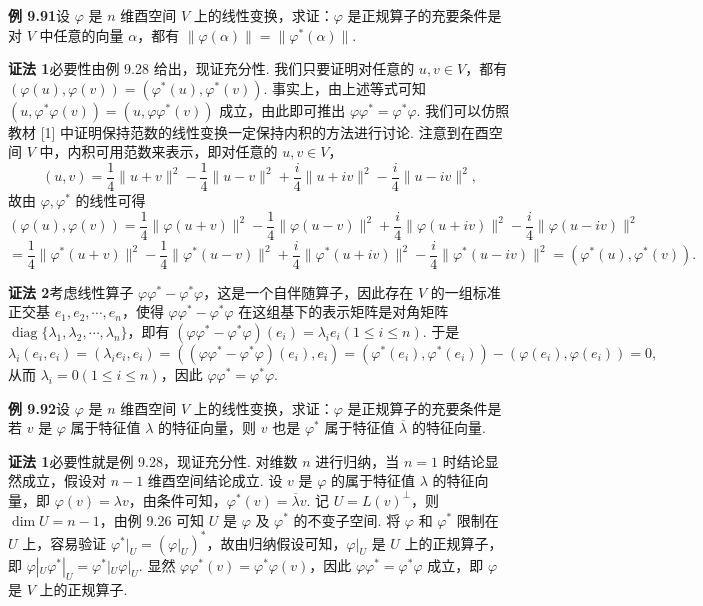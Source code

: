 \documentclass[UTF8, 12pt, fontset=fandol, oneside]{ctexart}
\begin{document}
\noindent\textbf{例 9.91}\quad 设 $\varphi$ 是 $n$ 维酉空间 $V$ 上的线性变换，求证：$\varphi$ 是正规算子的充要条件是对 $V$ 中任意的向量 $\alpha$，都有 $\|\varphi(\alpha)\|=\|\varphi^*(\alpha)\|$.

\noindent\textbf{证法 1}\quad 必要性由例 9.28 给出，现证充分性. 我们只要证明对任意的 $u,v\in V$，都有 $(\varphi(u),\varphi(v))=(\varphi^*(u),\varphi^*(v))$. 事实上，由上述等式可知 $(u,\varphi^*\varphi(v))=(u,\varphi\varphi^*(v))$ 成立，由此即可推出 $\varphi\varphi^*=\varphi^*\varphi$. 我们可以仿照教材 [1] 中证明保持范数的线性变换一定保持内积的方法进行讨论. 注意到在酉空间 $V$ 中，内积可用范数来表示，即对任意的 $u,v\in V$，
\[
(u,v)=\frac14\|u+v\|^2-\frac14\|u-v\|^2+\frac{i}{4}\|u+iv\|^2-\frac{i}{4}\|u-iv\|^2,
\]
故由 $\varphi,\varphi^*$ 的线性可得
\[
(\varphi(u),\varphi(v))
=\frac14\|\varphi(u+v)\|^2-\frac14\|\varphi(u-v)\|^2+\frac{i}{4}\|\varphi(u+iv)\|^2-\frac{i}{4}\|\varphi(u-iv)\|^2
\]
\[
=\frac14\|\varphi^*(u+v)\|^2-\frac14\|\varphi^*(u-v)\|^2+\frac{i}{4}\|\varphi^*(u+iv)\|^2-\frac{i}{4}\|\varphi^*(u-iv)\|^2
=(\varphi^*(u),\varphi^*(v)).
\]

\noindent\textbf{证法 2}\quad 考虑线性算子 $\varphi\varphi^*-\varphi^*\varphi$，这是一个自伴随算子，因此存在 $V$ 的一组标准正交基 $e_1,e_2,\cdots,e_n$，使得 $\varphi\varphi^*-\varphi^*\varphi$ 在这组基下的表示矩阵是对角矩阵 $\operatorname{diag}\{\lambda_1,\lambda_2,\cdots,\lambda_n\}$，即有 $(\varphi\varphi^*-\varphi^*\varphi)(e_i)=\lambda_ie_i(1\le i\le n)$. 于是
\[
\lambda_i(e_i,e_i)=(\lambda_ie_i,e_i)=((\varphi\varphi^*-\varphi^*\varphi)(e_i),e_i)=(\varphi^*(e_i),\varphi^*(e_i))-(\varphi(e_i),\varphi(e_i))=0,
\]
从而 $\lambda_i=0(1\le i\le n)$，因此 $\varphi\varphi^*=\varphi^*\varphi$.

\noindent\textbf{例 9.92}\quad 设 $\varphi$ 是 $n$ 维酉空间 $V$ 上的线性变换，求证：$\varphi$ 是正规算子的充要条件是若 $v$ 是 $\varphi$ 属于特征值 $\lambda$ 的特征向量，则 $v$ 也是 $\varphi^*$ 属于特征值 $\overline{\lambda}$ 的特征向量.

\noindent\textbf{证法 1}\quad 必要性就是例 9.28，现证充分性. 对维数 $n$ 进行归纳，当 $n=1$ 时结论显然成立，假设对 $n-1$ 维酉空间结论成立. 设 $v$ 是 $\varphi$ 的属于特征值 $\lambda$ 的特征向量，即 $\varphi(v)=\lambda v$，由条件可知，$\varphi^*(v)=\overline{\lambda}v$. 记 $U=L(v)^\perp$，则 $\dim U=n-1$，由例 9.26 可知 $U$ 是 $\varphi$ 及 $\varphi^*$ 的不变子空间. 将 $\varphi$ 和 $\varphi^*$ 限制在 $U$ 上，容易验证 $\varphi^*|_U=(\varphi|_U)^*$，故由归纳假设可知，$\varphi|_U$ 是 $U$ 上的正规算子，即 $\varphi|_U\varphi^*|_U=\varphi^*|_U\varphi|_U$. 显然 $\varphi\varphi^*(v)=\varphi^*\varphi(v)$，因此 $\varphi\varphi^*=\varphi^*\varphi$ 成立，即 $\varphi$ 是 $V$ 上的正规算子.
\end{document}
